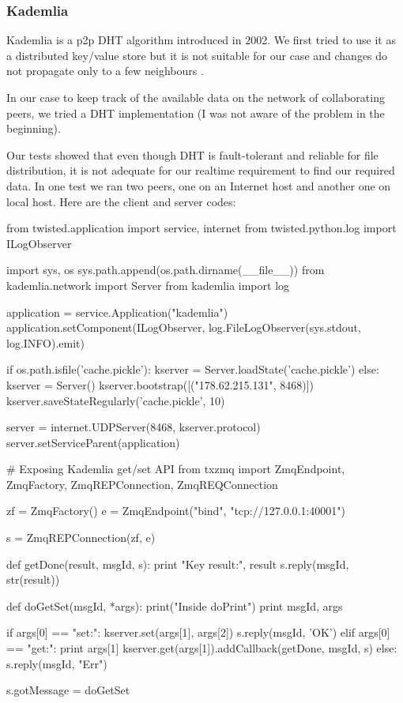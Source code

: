 \subsubsection{Kademlia}
Kademlia is a p2p DHT algorithm introduced in 2002. We first tried to use it as a distributed key/value store but 
it is not suitable for our case and changes do not propagate only to a few neighbours \cite{KademliaPaper}.

In our case to keep track of the available data on the network of collaborating peers, we tried a DHT implementation 
(I was not aware of the problem in the beginning).

Our tests showed that even though DHT is fault-tolerant and reliable for file distribution,
it is not adequate for our realtime requirement to find our required data. In one test we ran two peers,
one on an Internet host and another one on local host. Here are the client and server codes:

\begin{python}
from twisted.application import service, internet
from twisted.python.log import ILogObserver

import sys, os
sys.path.append(os.path.dirname(__file__))
from kademlia.network import Server
from kademlia import log

application = service.Application("kademlia")
application.setComponent(ILogObserver, 
	log.FileLogObserver(sys.stdout, log.INFO).emit)

if os.path.isfile('cache.pickle'):
    kserver = Server.loadState('cache.pickle')
else:
    kserver = Server()
    kserver.bootstrap([("178.62.215.131", 8468)])
kserver.saveStateRegularly('cache.pickle', 10)

server = internet.UDPServer(8468, kserver.protocol)
server.setServiceParent(application)


# Exposing Kademlia get/set API
from txzmq import ZmqEndpoint, ZmqFactory, ZmqREPConnection,
 ZmqREQConnection

zf = ZmqFactory()
e = ZmqEndpoint("bind", "tcp://127.0.0.1:40001")

s = ZmqREPConnection(zf, e)

def getDone(result, msgId, s):
    print "Key result:", result
    s.reply(msgId, str(result))

def doGetSet(msgId, *args):
    print("Inside doPrint")
    print msgId, args

    if args[0] == "set:":
        kserver.set(args[1], args[2])
        s.reply(msgId, 'OK')
    elif args[0] == "get:":
        print args[1]
        kserver.get(args[1]).addCallback(getDone, msgId, s)
    else:
        s.reply(msgId, "Err")

s.gotMessage = doGetSet
\end{python}

